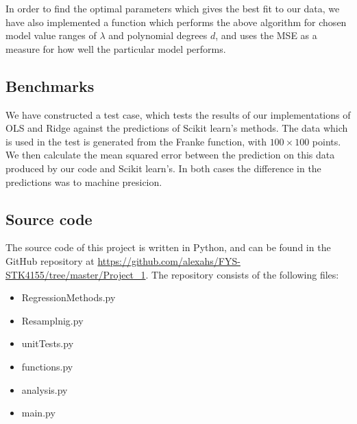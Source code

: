 In order to find the optimal parameters which gives the best fit to our data, we have also implemented a function which performs the above algorithm for chosen model value ranges of $\lambda$ and polynomial degrees $d$, and uses the MSE as a measure for how well the particular model performs.

\subsection{Benchmarks}
We have constructed a test case, which tests the results of our implementations of OLS and Ridge against the predictions of Scikit learn's methods. The data which is used in the test is generated from the Franke function, with $100 \times 100$ points. We then calculate the mean squared error between the prediction on this data produced by our code and Scikit learn's. In both cases the difference in the predictions was to machine presicion.
\subsection{Source code}

The source code of this project is written in Python, and can be found in the GitHub repository at \url{https://github.com/alexahs/FYS-STK4155/tree/master/Project_1}. The repository consists of the following files:
\begin{itemize}
    \item RegressionMethods.py
    \item Resamplnig.py
    \item unitTests.py
    \item functions.py
    \item analysis.py
    \item main.py
\end{itemize}


